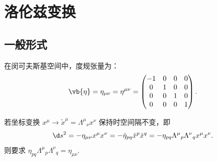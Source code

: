 \section{洛伦兹变换}
\subsection{一般形式}
在闵可夫斯基空间中，度规张量为：
\begin{equation*}
	\vb{\eta} = \eta_{\mu\nu} = \eta^{\mu\nu} = \begin{pmatrix}
		-1 & 0 & 0 & 0 \\
		0  & 1 & 0 & 0 \\
		0  & 0 & 1 & 0 \\
		0  & 0 & 0 & 1
	\end{pmatrix}.
\end{equation*}

若坐标变换 \(x^\mu \to \tilde{x}^\mu = \Lambda^\mu{}_\nu x^\nu\) 保持时空间隔不变，即
\begin{equation*}
	\d s^2 = -\eta_{\mu\nu} x^\mu x^\nu = -\tilde{\eta}_{pq} \tilde{x}^p \tilde{x}^q = -\eta_{pq} \Lambda^\mu{}_p \Lambda^\nu{}_q x^\mu x^\nu.
\end{equation*}
则要求 \(\eta_{pq} \Lambda^\mu{}_p \Lambda^\nu{}_q = \eta_{\mu\nu}\).

